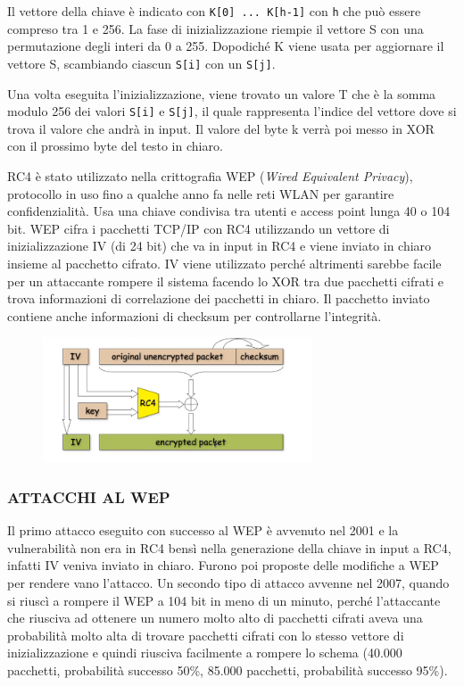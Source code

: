 Il vettore della chiave è indicato con \texttt{K[0] ... K[h-1]} con \texttt{h} che può essere compreso tra 1 e 256. La fase di inizializzazione riempie il vettore S con una permutazione degli interi da 0 a 255. Dopodiché K viene usata per aggiornare il vettore S, scambiando ciascun \texttt{S[i]} con un \texttt{S[j]}. 

Una volta eseguita l'inizializzazione, viene trovato un valore T che è la somma modulo 256 dei valori \texttt{S[i]} e \texttt{S[j]}, il quale rappresenta l'indice del vettore dove si trova il valore che andrà in input. Il valore del byte k verrà poi messo in XOR con il prossimo byte del testo in chiaro. 

RC4 è stato utilizzato nella crittografia WEP (\textit{Wired Equivalent Privacy}), protocollo in uso fino a qualche anno fa nelle reti WLAN per garantire confidenzialità. Usa una chiave condivisa tra utenti e access point lunga 40 o 104 bit. WEP cifra i pacchetti TCP/IP con RC4 utilizzando un vettore di inizializzazione IV (di 24 bit) che va in input in RC4 e viene inviato in chiaro insieme al pacchetto cifrato. IV viene utilizzato perché altrimenti sarebbe facile per un attaccante rompere il sistema facendo lo XOR tra due pacchetti cifrati e trova informazioni di correlazione dei pacchetti in chiaro. Il pacchetto inviato contiene anche informazioni di checksum per controllarne l'integrità.

\begin{figure}[htb!]
    \centering
    \includegraphics[width=8cm]{./Images/cap1/1.36.png}
\end{figure} 

\subsubsection{\textbf{ATTACCHI AL WEP}}
Il primo attacco eseguito con successo al WEP è avvenuto nel 2001 e la vulnerabilità non era in RC4 bensì nella generazione della chiave in input a RC4, infatti IV veniva inviato in chiaro. Furono poi proposte delle modifiche a WEP per rendere vano l'attacco. Un secondo tipo di attacco avvenne nel 2007, quando si riuscì a rompere il WEP a 104 bit in meno di un minuto, perché l'attaccante che riusciva ad ottenere un numero molto alto di pacchetti cifrati aveva una probabilità molto alta di trovare pacchetti cifrati con lo stesso vettore di inizializzazione e quindi riusciva facilmente a rompere lo schema (40.000 pacchetti, probabilità successo 50\%, 85.000 pacchetti, probabilità successo 95\%). 

